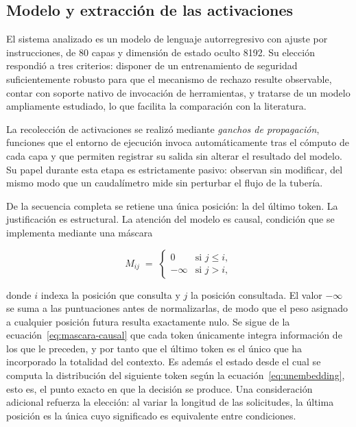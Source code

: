 \subsection{Modelo y extracción de las activaciones}

El sistema analizado es un modelo de lenguaje autorregresivo con ajuste por
instrucciones, de 80 capas y dimensión de estado oculto 8192. Su elección
respondió a tres criterios: disponer de un entrenamiento de seguridad
suficientemente robusto para que el mecanismo de rechazo resulte observable,
contar con soporte nativo de invocación de herramientas, y tratarse de un
modelo ampliamente estudiado, lo que facilita la comparación con la literatura.

La recolección de activaciones se realizó mediante \textit{ganchos de
propagación}, funciones que el entorno de ejecución invoca automáticamente tras
el cómputo de cada capa y que permiten registrar su salida sin alterar el
resultado del modelo. Su papel durante esta etapa es estrictamente pasivo:
observan sin modificar, del mismo modo que un caudalímetro mide sin perturbar
el flujo de la tubería.

De la secuencia completa se retiene una única posición: la del último token.
La justificación es estructural. La atención del modelo es causal, condición
que se implementa mediante una máscara

\begin{equation}
  M_{ij} \;=\;
  \begin{cases}
    0        & \text{si } j \le i,\\[2pt]
    -\infty  & \text{si } j > i,
  \end{cases}
  \label{eq:mascara-causal}
\end{equation}

\noindent
donde $i$ indexa la posición que consulta y $j$ la posición consultada. El valor
$-\infty$ se suma a las puntuaciones antes de normalizarlas, de modo que el peso
asignado a cualquier posición futura resulta exactamente nulo. Se sigue de la
ecuación~\eqref{eq:mascara-causal} que cada token únicamente integra información
de los que le preceden, y por tanto que el último token es el único que ha
incorporado la totalidad del contexto. Es además el estado desde el cual se
computa la distribución del siguiente token según la
ecuación~\eqref{eq:unembedding}, esto es, el punto exacto en que la decisión se
produce. Una consideración adicional refuerza la elección: al variar la longitud
de las solicitudes, la última posición es la única cuyo significado es
equivalente entre condiciones.

